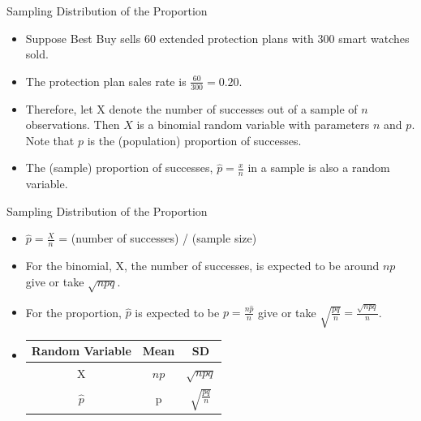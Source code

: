 \documentclass[14pt]{beamer}\usepackage[]{graphicx}\usepackage[]{color}
\begin{document}
\begin{frame}[fragile]{Sampling Distribution of the Proportion}

\begin{itemize}
\item<1-> Suppose Best Buy sells 60 extended protection plans with 300 smart watches sold.

\item<2-> The protection plan sales rate is  $\frac{60}{300} = 0.20$.

\item<3-> Therefore, let X denote the number of successes out of a sample  of $n$ observations. Then $X$ is a binomial random variable with  parameters $n$ and $p$. Note that $p$ is the (population) proportion of  successes.

\item<4-> The (sample) proportion of successes, $\hat{p} = \frac{x}{n}$ in a sample is also a random variable.
\end{itemize}
\end{frame}

\begin{frame}[fragile]{Sampling Distribution of the Proportion}

\begin{itemize}
\item<1-> $\hat{p} = \frac{X}{n}$ = (number of successes) / (sample size)

\item<2-> For the binomial, X, the number of successes, is expected to be around $np$ give or take $\sqrt{ n p q}$.

\item<3-> For the proportion, $\hat{p}$ is expected to be $p = \frac{n \hat{p}}{n}$ give or take $\sqrt{ \frac{p q}{n}} = \frac{ \sqrt{n p q}}{n}$. 

\item<4->
\begin{table}
\centering
\begin{tabular}{@{} ccc @{}} \hline
Random Variable & Mean & SD \\ \hline
X & $np$ & $\sqrt{n p q}$ \\
$\hat{p}$ & p & $\sqrt{ \frac{p q}{n}}$ \\ \hline
\end{tabular}
\end{table}
\end{itemize}
\end{frame}
\end{document}

